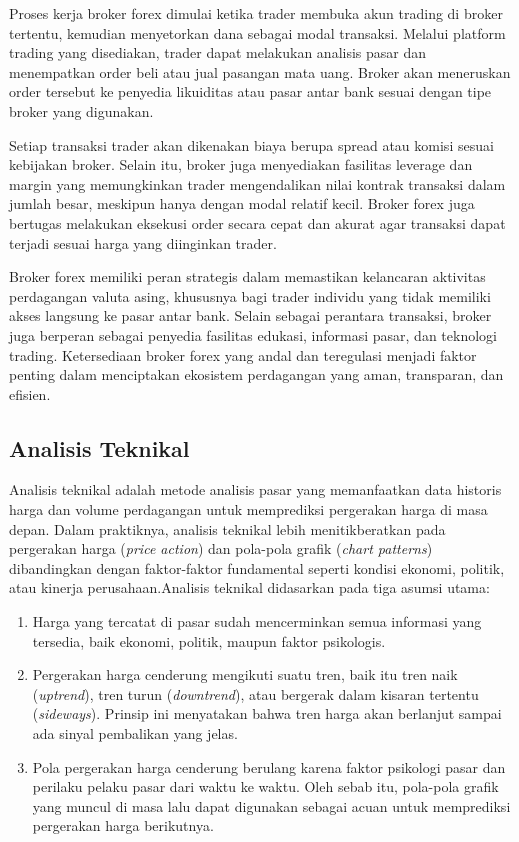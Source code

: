 Proses kerja broker forex dimulai ketika trader membuka akun trading di broker tertentu, kemudian menyetorkan dana sebagai modal transaksi. Melalui platform trading yang disediakan, trader dapat melakukan analisis pasar dan menempatkan order beli atau jual pasangan mata uang. Broker akan meneruskan order tersebut ke penyedia likuiditas atau pasar antar bank sesuai dengan tipe broker yang digunakan.

Setiap transaksi trader akan dikenakan biaya berupa spread atau komisi sesuai kebijakan broker. Selain itu, broker juga menyediakan fasilitas leverage dan margin yang memungkinkan trader mengendalikan nilai kontrak transaksi dalam jumlah besar, meskipun hanya dengan modal relatif kecil. Broker forex juga bertugas melakukan eksekusi order secara cepat dan akurat agar transaksi dapat terjadi sesuai harga yang diinginkan trader.

Broker forex memiliki peran strategis dalam memastikan kelancaran aktivitas perdagangan valuta asing, khususnya bagi trader individu yang tidak memiliki akses langsung ke pasar antar bank. Selain sebagai perantara transaksi, broker juga berperan sebagai penyedia fasilitas edukasi, informasi pasar, dan teknologi trading. Ketersediaan broker forex yang andal dan teregulasi menjadi faktor penting dalam menciptakan ekosistem perdagangan yang aman, transparan, dan efisien.

\subsection{Analisis Teknikal}
Analisis teknikal adalah metode analisis pasar yang memanfaatkan data historis harga dan volume perdagangan untuk memprediksi pergerakan harga di masa depan. Dalam praktiknya, analisis teknikal lebih menitikberatkan pada pergerakan harga (\textit{price action}) dan pola-pola grafik (\textit{chart patterns}) dibandingkan dengan faktor-faktor fundamental seperti kondisi ekonomi, politik, atau kinerja perusahaan.Analisis teknikal didasarkan pada tiga asumsi utama:

\begin{enumerate}
    \item Harga yang tercatat di pasar sudah mencerminkan semua informasi yang tersedia, baik ekonomi, politik, maupun faktor psikologis.

    \item Pergerakan harga cenderung mengikuti suatu tren, baik itu tren naik (\textit{uptrend}), tren turun (\textit{downtrend}), atau bergerak dalam kisaran tertentu (\textit{sideways}). Prinsip ini menyatakan bahwa tren harga akan berlanjut sampai ada sinyal pembalikan yang jelas.

    \item Pola pergerakan harga cenderung berulang karena faktor psikologi pasar dan perilaku pelaku pasar dari waktu ke waktu. Oleh sebab itu, pola-pola grafik yang muncul di masa lalu dapat digunakan sebagai acuan untuk memprediksi pergerakan harga berikutnya.
\end{enumerate}

